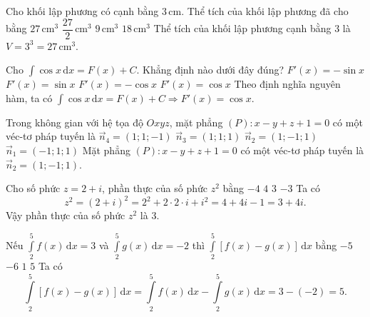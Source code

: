 \begin{ex}%
Cho khối lập phương có cạnh bằng $3\,\text{cm}$. Thể tích của khối lập phương đã cho bằng
\choice
{\True $27\,\text{cm}^3$}
{$\dfrac{27}{2}\,\text{cm}^3$}
{$9\,\text{cm}^3$}
{$18\,\text{cm}^3$}
\loigiai
{Thể tích của khối lập phương cạnh bằng $3$ là $V=3^3=27\,\text{cm}^3$.
}
\end{ex}

\begin{ex}%
Cho $\displaystyle\int\cos x\mathrm{\,d}x=F(x)+C$. Khẳng định nào dưới đây đúng?
\choice
{$F'(x)=-\sin x$}
{$F'(x)=\sin x$}
{$F'(x)=-\cos x$}
{\True $F'(x)=\cos x$}
\loigiai
{Theo định nghĩa nguyên hàm, ta có $\displaystyle\int\cos x\mathrm{\,d}x=F(x)+C\Rightarrow F'(x)=\cos x$.
}
\end{ex}

\begin{ex}%
Trong không gian với hệ tọa độ $Oxyz$, mặt phẳng $(P)\colon x-y+z+1=0$ có một véc-tơ pháp tuyến là
\choice
{$\overrightarrow{n}_4=(1;1;-1)$}
{$\overrightarrow{n}_3=(1;1;1)$}
{\True $\overrightarrow{n}_2=(1;-1;1)$}
{$\overrightarrow{n}_1=(-1;1;1)$}
\loigiai
{Mặt phẳng $(P)\colon x-y+z+1=0$ có một véc-tơ pháp tuyến là $\overrightarrow{n}_2=(1;-1;1)$.
}
\end{ex}

\begin{ex}%
Cho số phức $z=2+i$, phần thực của số phức $z^2$ bằng
\choice
{$-4$}
{$4$}
{\True $3$}
{$-3$}
\loigiai
{Ta có 
\[z^2=(2+i)^2=2^2+2\cdot 2\cdot i+i^2=4+4i-1=3+4i.\]
Vậy phần thực của số phức $z^2$ là 3.
}
\end{ex}

\begin{ex}%
Nếu $\displaystyle\int\limits_2^5 f(x)\mathrm{\,d}x=3$ và $\displaystyle\int\limits_2^5 g(x)\mathrm{\,d}x=-2$ thì $\displaystyle\int\limits_2^5 [f(x)-g(x)]\mathrm{\,d}x$ bằng
\choice
{$-5$}
{$-6$}
{$1$}
{\True $5$}
\loigiai
{Ta có \[\displaystyle\int\limits_2^5 [f(x)-g(x)]\mathrm{\,d}x=\displaystyle\int\limits_2^5 f(x)\mathrm{\,d}x-\displaystyle\int\limits_2^5 g(x)\mathrm{\,d}x=3-(-2)=5.\]
}
\end{ex}


